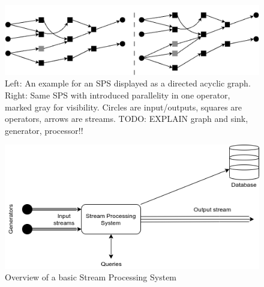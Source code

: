         
        


        \begin{figure}[h]
        \label{fig:sps_parallel_normal}
        \centering
        \includegraphics[width=1.0\textwidth]{Bilder/sps_parallel_normal.png}
        \caption{
                Left: An example for an SPS displayed as a directed acyclic graph. 
                Right: Same SPS with introduced parallelity in one operator, marked gray for visibility. 
                Circles are input/outputs, squares are operators, arrows are streams.
                TODO: EXPLAIN graph and sink, generator, processor!!
                }
        \end{figure}

        \begin{figure}
        \label{fig:stream-processing-system}
        \centering
        \includegraphics[width=1.0\textwidth]{Bilder/stream-processing-system.png}
        \caption{
                Overview of a basic Stream Processing System
                }
        \end{figure}  

